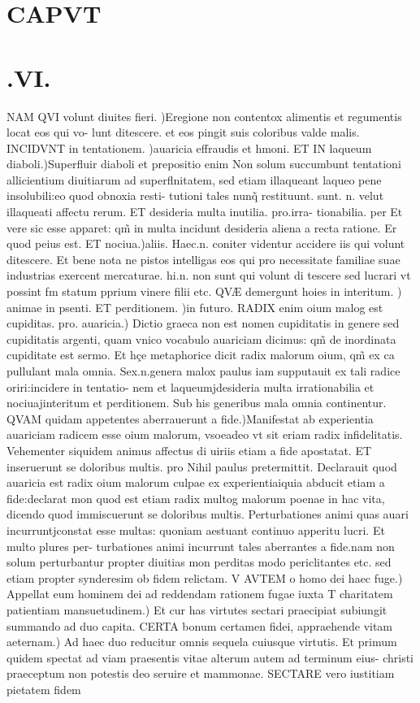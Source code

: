 \documentclass{article}
\begin{document}
\begin{pages}
\section*{CAPVT }
\section*{.VI. }\pstart NAM QVI volunt diuites fieri. )Eregione non contentox alimentis et regumentis locat eos qui vo- lunt ditescere. et eos pingit suis coloribus valde malis. INCIDVNT in tentationem. )auaricia effraudis  et hmoni. ET IN laqueum diaboli.)Superfluir diaboli et prepositio enim Non solum succumbunt tentationi allicientium diuitiarum ad superflnitatem, sed etiam illaqueant laqueo pene insolubili:eo quod obnoxia resti- tutioni tales nunq̃ restituunt. sunt. n. velut illaqueati affectu rerum. ET desideria multa inutilia. pro.irra- tionabilia. per Et vere sic esse apparet: qm̃ in multa incidunt desideria aliena a recta ratione. Er quod peius est. ET nociua.)aliis. Haec.n. coniter videntur accidere iis qui volunt ditescere. Et bene nota ne pistos intelligas eos qui pro necessitate familiae suae industrias exercent mercaturae. hi.n. non sunt qui volunt di tescere sed lucrari vt possint fm statum pprium vinere filii etc. QVÆ demergunt hoies in interitum. ) animae in psenti. ET perditionem. )in futuro. RADIX enim oium malog est cupiditas. pro. auaricia.) Dictio graeca non est nomen cupiditatis in genere sed cupiditatis argenti, quam vnico vocabulo auariciam dicimus: qm̃ de inordinata cupiditate est sermo. Et hçe metaphorice dicit radix malorum oium, qm̃ ex ca pullulant mala omnia. Sex.n.genera malox paulus iam supputauit ex tali radice oriri:incidere in tentatio- nem et laqueumjdesideria multa irrationabilia et nociuajinteritum et perditionem. Sub his generibus mala omnia continentur. QVAM quidam appetentes aberrauerunt a fide.)Manifestat ab experientia auariciam radicem esse oium malorum, vsoeadeo vt sit eriam radix infidelitatis. Vehementer siquidem animus affectus di uiriis etiam a fide apostatat. ET inseruerunt se doloribus multis. pro Nihil paulus pretermittit. Declarauit quod auaricia est radix oium malorum culpae ex experientiaiquia abducit etiam a fide:declarat mon quod est etiam radix multog malorum poenae in hac vita, dicendo quod immiscuerunt se doloribus multis. Perturbationes animi quas auari incurruntjconstat esse multas: quoniam aestuant continuo apperitu lucri. Et multo plures per- turbationes animi incurrunt tales aberrantes a fide.nam non solum perturbantur propter diuitias mon perditas modo periclitantes etc. sed etiam propter synderesim ob fidem relictam.  \pend
\marginpar{[ p.146 ]}\pstart V AVTEM o homo dei haec fuge.) Appellat eum hominem dei ad reddendam rationem fugae iuxta T charitatem patientiam mansuetudinem.) Et cur has virtutes sectari praecipiat subiungit summando ad duo capita. CERTA bonum certamen fidei, appraehende vitam aeternam.) Ad haec duo reducitur omnis sequela cuiusque virtutis. Et primum quidem spectat ad viam praesentis vitae alterum autem ad terminum eius- christi praeceptum non potestis deo seruire et mammonae. SECTARE vero iustitiam pietatem fidem  \pend

\end{pages}
\end{document}
